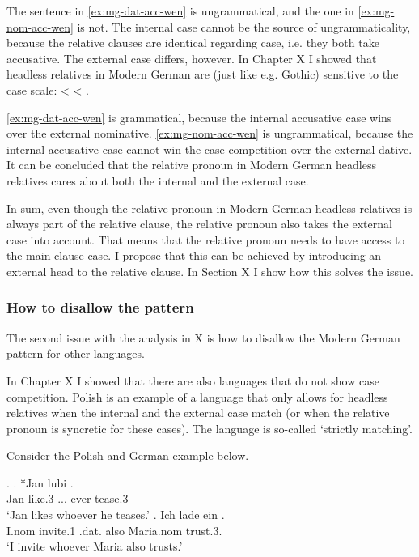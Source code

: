 The sentence in \ref{ex:mg-dat-acc-wen} is ungrammatical, and the one in \ref{ex:mg-nom-acc-wen} is not. The internal case cannot be the source of ungrammaticality, because the relative clauses are identical regarding case, i.e. they both take accusative. The external case differs, however. In Chapter X I showed that headless relatives in Modern German are (just like e.g. Gothic) sensitive to the case scale:  <  < .

\ref{ex:mg-dat-acc-wen} is grammatical, because the internal accusative case wins over the external nominative. \ref{ex:mg-nom-acc-wen} is ungrammatical, because the internal accusative case cannot win the case competition over the external dative. It can be concluded that the relative pronoun in Modern German headless relatives cares about both the internal and the external case.

In sum, even though the relative pronoun in Modern German headless relatives is always part of the relative clause, the relative pronoun also takes the external case into account. That means that the relative pronoun needs to have access to the main clause case. I propose that this can be achieved by introducing an external head to the relative clause. In Section X I show how this solves the issue.


\subsubsection{How to disallow the pattern}

The second issue with the analysis in X is how to disallow the Modern German pattern for other languages.

In Chapter X I showed that there are also languages that do not show case competition. Polish is an example of a language that only allows for headless relatives when the internal and the external case match (or when the relative pronoun is syncretic for these cases). The language is so-called `strictly matching'.

Consider the Polish and German example below.

\ex.
\ag. *Jan lubi   .\\
Jan like.3\scsub{[acc]} ... ever tease.3\scsub{[dat]}\\
`Jan likes whoever he teases.'\label{ex:polish-acc-dat}
\bg. Ich {lade ein}    . \\
 I.\ac{nom} invite.1\scsub{[acc]} .\ac{dat}. also Maria.\ac{nom} trust.3\scsub{[dat]}.\\
 `I invite whoever Maria also trusts.' \label{ex:mg-acc-dat-disallow}

